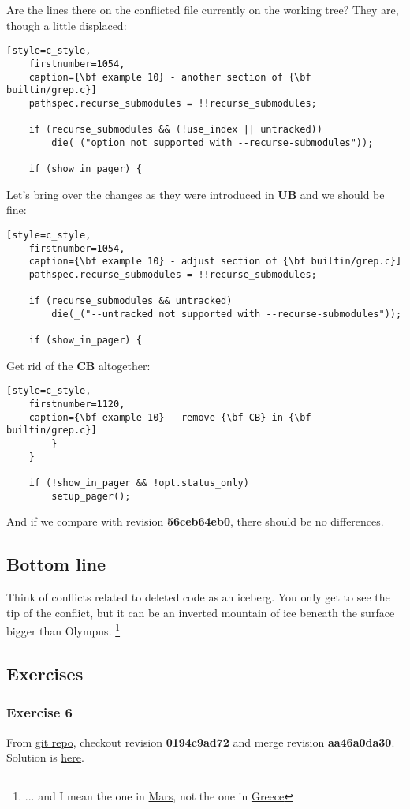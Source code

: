 Are the lines there on the conflicted file currently on the working tree? They are, though a little displaced:
\begin{lstlisting}[style=c_style,
	firstnumber=1054,
	caption={\bf example 10} - another section of {\bf builtin/grep.c}]
	pathspec.recurse_submodules = !!recurse_submodules;

	if (recurse_submodules && (!use_index || untracked))
		die(_("option not supported with --recurse-submodules"));

	if (show_in_pager) {
\end{lstlisting}

Let's bring over the changes as they were introduced in {\bf UB} and we should be fine:
\begin{lstlisting}[style=c_style,
	firstnumber=1054,
	caption={\bf example 10} - adjust section of {\bf builtin/grep.c}]
	pathspec.recurse_submodules = !!recurse_submodules;

	if (recurse_submodules && untracked)
		die(_("--untracked not supported with --recurse-submodules"));

	if (show_in_pager) {
\end{lstlisting}

Get rid of the {\bf CB} altogether:
\begin{lstlisting}[style=c_style,
	firstnumber=1120,
	caption={\bf example 10} - remove {\bf CB} in {\bf builtin/grep.c}]
		}
	}

	if (!show_in_pager && !opt.status_only)
		setup_pager();
\end{lstlisting}

And if we compare with revision {\bf 56ceb64eb0}, there should be no differences.

\subsection{Bottom line}
Think of conflicts related to deleted code as an iceberg. You only get to see the tip of the conflict, but it can be an
inverted mountain of ice beneath the surface bigger than Olympus.
\footnote{... and I mean the one in \href{https://en.wikipedia.org/wiki/Olympus_Mons}{Mars}, not the one in
\href{https://en.wikipedia.org/wiki/Mount_Olympus}{Greece}}

\subsection{Exercises}
\subsubsection{Exercise 6}
From \hyperref[git_repo]{git repo}, checkout revision {\bf 0194c9ad72} and merge revision {\bf aa46a0da30}. Solution is
\hyperref[exercise_06]{here}.

